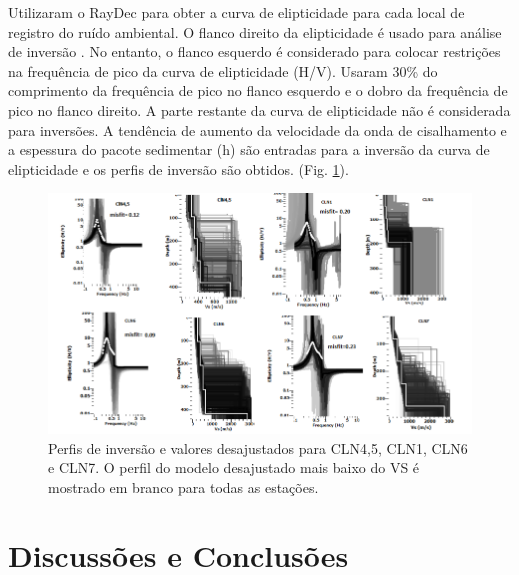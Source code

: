 \documentclass[smallextended]{svjour3}       %
\begin{document}
Utilizaram o RayDec para obter a curva de elipticidade para cada local de registro do ruído ambiental. O flanco direito da elipticidade é usado para análise de inversão \citep{hobiger2013ground}. No entanto, o flanco esquerdo é considerado  para colocar restrições na frequência de pico da curva de elipticidade (H/V). Usaram 30\% do comprimento da frequência de pico no flanco esquerdo e o dobro da frequência de pico no flanco direito. A parte restante da curva de elipticidade não é considerada para inversões. A tendência de aumento da velocidade da onda de cisalhamento e a espessura do pacote sedimentar (h) são entradas para a inversão da curva de elipticidade e os perfis de inversão são obtidos. (Fig. \ref{elipticidade}).

\begin{figure}[!hbtp]
  \begin{center}
  
  \includegraphics[scale=0.7]{Figures/fig7.png}
  \end{center}
  \caption{Perfis de inversão e valores desajustados para CLN4,5, CLN1, CLN6 e CLN7. O perfil do modelo desajustado mais baixo do VS é mostrado em branco para todas as estações.}
  \label{elipticidade}
\end{figure}
\newpage


\section{Discussões e Conclusões}
\end{document}
